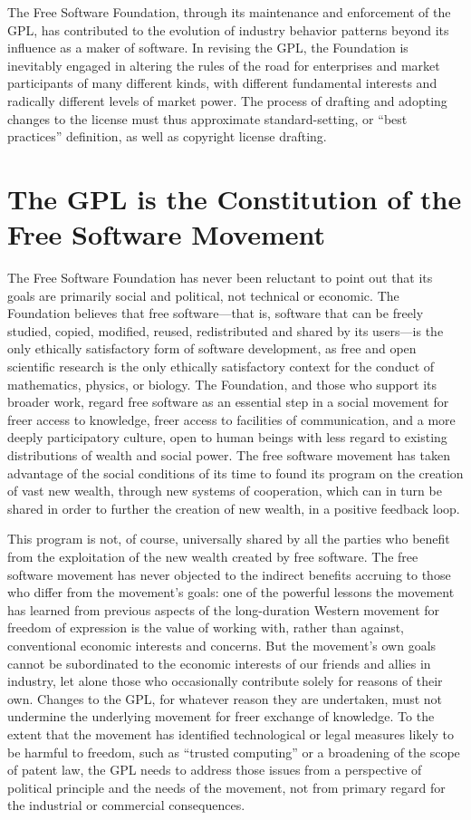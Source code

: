 \documentclass[11pt, letterpaper]{book}
\begin{document}
The Free Software Foundation, through its maintenance and enforcement
of the GPL, has contributed to the evolution of industry behavior
patterns beyond its influence as a maker of software.  In revising the
GPL, the Foundation is inevitably engaged in altering the rules of the
road for enterprises and market participants of many different kinds,
with different fundamental interests and radically different levels of
market power.  The process of drafting and adopting changes to the
license must thus approximate standard-setting, or ``best practices''
definition, as well as copyright license drafting.

\section*{The GPL is the Constitution of the Free Software Movement}

The Free Software Foundation has never been reluctant to point out
that its goals are primarily social and political, not technical or
economic.  The Foundation believes that free software---that is,
software that can be freely studied, copied, modified, reused,
redistributed and shared by its users---is the only ethically
satisfactory form of software development, as free and open scientific
research is the only ethically satisfactory context for the conduct of
mathematics, physics, or biology.  The Foundation, and those who
support its broader work, regard free software as an essential step in
a social movement for freer access to knowledge, freer access to
facilities of communication, and a more deeply participatory culture,
open to human beings with less regard to existing distributions of
wealth and social power.  The free software movement has taken
advantage of the social conditions of its time to found its program on
the creation of vast new wealth, through new systems of cooperation,
which can in turn be shared in order to further the creation of new
wealth, in a positive feedback loop.

This program is not, of course, universally shared by all the parties
who benefit from the exploitation of the new wealth created by free
software.  The free software movement has never objected to the
indirect benefits accruing to those who differ from the movement's
goals: one of the powerful lessons the movement has learned from
previous aspects of the long-duration Western movement for freedom of
expression is the value of working with, rather than against,
conventional economic interests and concerns.  But the movement's own
goals cannot be subordinated to the economic interests of our friends
and allies in industry, let alone those who occasionally contribute
solely for reasons of their own.  Changes to the GPL, for whatever
reason they are undertaken, must not undermine the underlying movement
for freer exchange of knowledge.  To the extent that the movement has
identified technological or legal measures likely to be harmful to
freedom, such as ``trusted computing'' or a broadening of the scope of
patent law, the GPL needs to address those issues from a perspective
of political principle and the needs of the movement, not from primary
regard for the industrial or commercial consequences.
\end{document}
